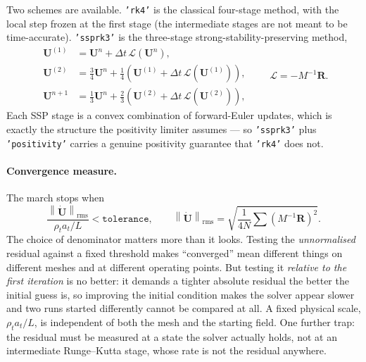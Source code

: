 \documentclass[11pt,a4paper]{article}
\newcommand{\vect}[1]{\boldsymbol{#1}}
\newcommand{\Uvec}{\vect{U}}
\newcommand{\code}[1]{\texttt{#1}}
\begin{document}
Two schemes are available.  \code{'rk4'} is the classical four-stage method, with
the local step frozen at the first stage (the intermediate stages are not meant
to be time-accurate).  \code{'ssprk3'} is the three-stage strong-stability-preserving
method,
\begin{equation}
  \begin{aligned}
    \Uvec^{(1)} &= \Uvec^{n} + \Delta t\, \mathcal{L}(\Uvec^{n}),\\
    \Uvec^{(2)} &= \tfrac{3}{4}\Uvec^{n} + \tfrac{1}{4}
      \left(\Uvec^{(1)} + \Delta t\, \mathcal{L}(\Uvec^{(1)})\right),\\
    \Uvec^{n+1} &= \tfrac{1}{3}\Uvec^{n} + \tfrac{2}{3}
      \left(\Uvec^{(2)} + \Delta t\, \mathcal{L}(\Uvec^{(2)})\right),
  \end{aligned}
  \qquad \mathcal{L} = -M^{-1}\vect{R}.
\end{equation}
Each SSP stage is a convex combination of forward-Euler updates, which is exactly
the structure the positivity limiter assumes --- so \code{'ssprk3'} plus
\code{'positivity'} carries a genuine positivity guarantee that \code{'rk4'} does
not.

\paragraph{Convergence measure.}  The march stops when
\begin{equation}
  \frac{\left\|\dot{\Uvec}\right\|_{\mathrm{rms}}}{\rho_t a_t / L}
  < \code{tolerance},
  \qquad
  \left\|\dot{\Uvec}\right\|_{\mathrm{rms}}
  = \sqrt{\frac{1}{4N}\sum \left(M^{-1}\vect{R}\right)^{2}} .
\end{equation}
The choice of denominator matters more than it looks.  Testing the
\emph{unnormalised} residual against a fixed threshold makes ``converged'' mean
different things on different meshes and at different operating points.  But
testing it \emph{relative to the first iteration} is no better: it demands a
tighter absolute residual the better the initial guess is, so improving the
initial condition makes the solver appear slower and two runs started
differently cannot be compared at all.  A fixed physical scale,
$\rho_t a_t / L$, is independent of both the mesh and the starting field.  One
further trap: the residual must be measured at a state the solver actually
holds, not at an intermediate Runge--Kutta stage, whose rate is not the residual
anywhere.

\end{document}
